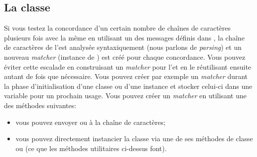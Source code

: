 \documentclass[a4paper,10pt,twoside]{book}
\begin{document}
\subsection{La classe }

Si vous testez la concordance d'un certain nombre de chaînes de
caractères plusieurs fois avec la même \expreg en utilisant un des
messages définis dans , la chaîne de caractères de
l'\expreg est analysée syntaxiquement
(nous parlons de \emph{parsing})
et un nouveau \emph{matcher}
(instance de )
est créé pour chaque concordance. Vous pouvez éviter cette escalade en
construisant un \emph{matcher} pour l'\expreg et en le réutilisant
ensuite autant de fois que nécessaire. Vous pouvez créer par exemple
un \emph{matcher} durant la phase d'initialisation d'une classe ou
d'une instance et stocker celui-ci dans une variable pour un
prochain usage. Vous pouvez créer un \emph{matcher} en utilisant une
des méthodes suivantes:

\begin{itemize}
\item vous pouvez envoyer  ou
   à la chaîne de caractères;
\item vous pouvez directement instancier la classe  via
  une de ses méthodes de classe  ou
   (ce que les méthodes
  utilitaires ci-dessus font).

%

\end{itemize}
\end{document}
